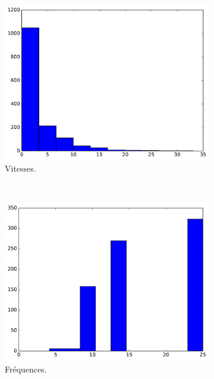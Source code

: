 	\newcommand{\subImgWclicks}{0.32\textwidth}
	
	\begin{figure}[htb]
		\begin{subfigure}[t]{\subImgWclicks}
			\centering
			\includegraphics[width=\textwidth]{figures/ch3/atom_speed}
			\caption{Vitesses.}
			\label{fig:atom_speed}
		\end{subfigure}
		~
		\begin{subfigure}[t]{\subImgWclicks}
			\centering
			\includegraphics[width=\textwidth]{figures/ch3/atom_frequency}
			\caption{Fréquences.}
			\label{fig:atom_frequency}
		\end{subfigure}
		~
		\begin{subfigure}[t]{\subImgWclicks}

\end{subfigure}
\end{figure}

